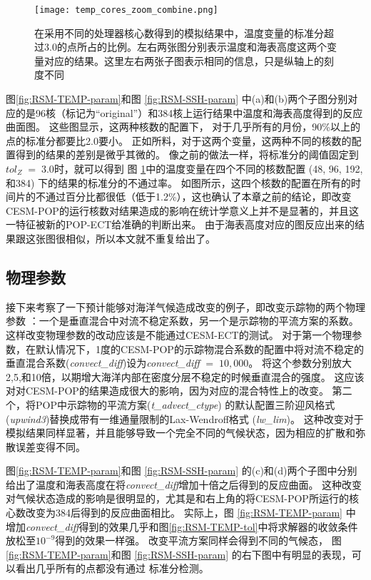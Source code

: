 \begin{figure}[!ht]
\centering
\texttt{[image: temp\_cores\_zoom\_combine.png]}
\caption{
在采用不同的处理器核心数得到的模拟结果中，温度变量的标准分超过3.0的点所占的比例。左右两张图分别表示温度和海表高度这两个变量对应的结果。这里左右两张子图表示相同的信息，只是纵轴上的刻度不同}
\label{fig:combine}
\end{figure}
 
图\ref{fig:RSM-TEMP-param}和图 \ref{fig:RSM-SSH-param} 中(a)和(b)两个子图分别对应的是96核（标记为“original”）和384核上运行结果中温度和海表高度得到的反应曲面图。 
这些图显示，这两种核数的配置下， 对于几乎所有的月份，90\%以上的点的标准分都要比2.0要小。 
正如所料，对于这两个变量，这两种不同的核数的配置得到的结果的差别是微乎其微的。
像之前的做法一样，将标准分的阈值固定到$tol_{Z} \; = \; 3.0$时，就可以得到 图 \ref{fig:combine}中的温度变量在四个不同的核数配置 (48, 96, 192,和384) 下的结果的标准分的不通过率。
如图所示，这四个核数的配置在所有的时间片的不通过百分比都很低（低于1.2\%），这也确认了本章之前的结论，即改变CESM-POP的运行核数对结果造成的影响在统计学意义上并不是显著的，并且这一特征被新的POP-ECT给准确的判断出来。 
由于海表高度对应的图反应出来的结果跟这张图很相似，所以本文就不重复给出了。

 \subsection{物理参数}\label{verify:pp}


 
接下来考察了一下预计能够对海洋气候造成改变的例子，即改变示踪物的两个物理参数 ：一个是垂直混合中对流不稳定系数，另一个是示踪物的平流方案的系数。
这样改变物理参数的改动应该是不能通过CESM-ECT的测试。
对于第一个物理参数，在默认情况下，1度的CESM-POP的示踪物混合系数的配置中将对流不稳定的垂直混合系数(\textit{convect\_diff})设为\textit{convect\_diff} $=\; 10,000$。
将这个参数分别放大2,5,和10倍，以期增大海洋内部在密度分层不稳定的时候垂直混合的强度。
这应该对对CESM-POP的结果造成很大的影响，因为对应的混合特性上的改变。
第二个，将POP中示踪物的平流方案(\textit{t\_advect\_ctype}) 的默认配置三阶迎风格式(\textit{upwind3})替换成带有一维通量限制的Lax-Wendroff格式 (\textit{lw\_lim})。
这种改变对于模拟结果同样显著，并且能够导致一个完全不同的气候状态，因为相应的扩散和弥散误差变得不同。


 
图\ref{fig:RSM-TEMP-param}和图 \ref{fig:RSM-SSH-param} 的(c)和(d)两个子图中分别给出了温度和海表高度在将\textit{convect\_diff}增加十倍之后得到的反应曲面。 这种改变对气候状态造成的影响是很明显的，尤其是和右上角的将CESM-POP所运行的核心数改变为384后得到的反应曲面相比。
实际上，图  \ref{fig:RSM-TEMP-param} 中增加\textit{convect\_diff}得到的效果几乎和图\ref{fig:RSM-TEMP-tol}中将求解器的收敛条件放松至$10^{-9}$得到的效果一样强。
改变平流方案同样会得到不同的气候态， 图 \ref{fig:RSM-TEMP-param}和图 \ref{fig:RSM-SSH-param} 的右下图中有明显的表现，可以看出几乎所有的点都没有通过 标准分检测。 


